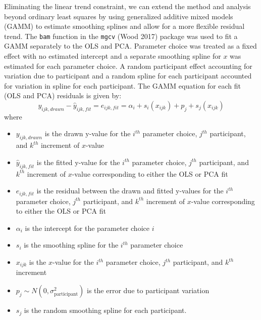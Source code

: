 \documentclass[
]{jds}
\providecommand{\tightlist}{%
  \setlength{\itemsep}{0pt}\setlength{\parskip}{0pt}}\usepackage{longtable,booktabs,array}
\begin{document}
Eliminating the linear trend constraint, we can extend the method and
analysis beyond ordinary least squares by using generalized additive
mixed models (GAMM) to estimate smoothing splines and allow for a more
flexible residual trend. The \texttt{bam} function in the \texttt{mgcv}
(Wood 2017) package was used to fit a GAMM separately to the OLS and
PCA. Parameter choice was treated as a fixed effect with no estimated
intercept and a separate smoothing spline for \(x\) was estimated for
each parameter choice. A random participant effect accounting for
variation due to participant and a random spline for each participant
accounted for variation in spline for each participant. The GAMM
equation for each fit (OLS and PCA) residuals is given by:
\begin{equation}
y_{ijk, drawn} - \hat y_{ijk, fit} = e_{ijk,fit} = \alpha_i + s_{i}(x_{ijk}) + p_{j} + s_{j}(x_{ijk})
\end{equation} \noindent where

\begin{itemize}
\tightlist
\item
  \(y_{ijk,drawn}\) is the drawn y-value for the \(i^{th}\) parameter
  choice, \(j^{th}\) participant, and \(k^{th}\) increment of
  \(x\)-value
\item
  \(\hat y_{ijk,fit}\) is the fitted y-value for the \(i^{th}\)
  parameter choice, \(j^{th}\) participant, and \(k^{th}\) increment of
  \(x\)-value corresponding to either the OLS or PCA fit
\item
  \(e_{ijk,fit}\) is the residual between the drawn and fitted y-values
  for the \(i^{th}\) parameter choice, \(j^{th}\) participant, and
  \(k^{th}\) increment of \(x\)-value corresponding to either the OLS or
  PCA fit
\item
  \(\alpha_i\) is the intercept for the parameter choice \(i\)
\item
  \(s_{i}\) is the smoothing spline for the \(i^{th}\) parameter choice
\item
  \(x_{ijk}\) is the \(x\)-value for the \(i^{th}\) parameter choice,
  \(j^{th}\) participant, and \(k^{th}\) increment
\item
  \(p_{j} \sim N(0, \sigma^2_\text{participant})\) is the error due to
  participant variation
\item
  \(s_{j}\) is the random smoothing spline for each participant.
\end{itemize}
\end{document}
